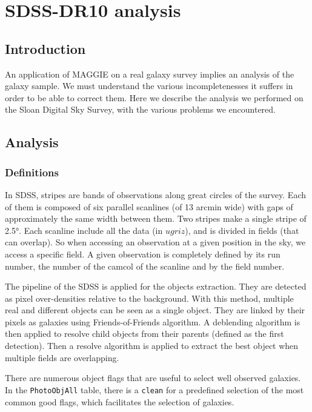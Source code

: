 \chapter{SDSS-DR10 analysis}
\label{cha:sdss}
\minitoc%

\section{Introduction}

An application of MAGGIE on a real galaxy survey implies an analysis of the
galaxy sample. We must understand the various incompletenesses it suffers in
order to be able to correct them. Here we describe the analysis we performed on
the Sloan Digital Sky Survey, with the various problems we encountered.

\section{Analysis}

\subsection{Definitions}

In SDSS, stripes are bands of observations along great circles of the survey.
Each of them is composed of six parallel scanlines (of 13 arcmin wide) with
gaps of approximately the same width between them. Two stripes make a single
stripe of 2.5°. Each scanline include all the data (in $ugriz$), and is divided
in fields (that can overlap). So when accessing an observation at a given
position in the sky, we access a specific field. A given observation is
completely defined by its run number, the number of the camcol of the scanline
and by the field number.

The pipeline of the SDSS is applied for the objects extraction. They are
detected as pixel over-densities relative to the background. With this method,
multiple real and different objects can be seen as a single object. They are
linked by their pixels as galaxies using Friends-of-Friends algorithm. A
deblending algorithm is then applied to resolve child objects from their
parents (defined as the first detection). Then a resolve algorithm is applied
to extract the best object when multiple fields are overlapping.

There are numerous object flags that are useful to select well observed
galaxies. In the \texttt{PhotoObjAll} table, there is a \texttt{clean} for a
predefined selection of the most common good flags, which facilitates the
selection of galaxies.

